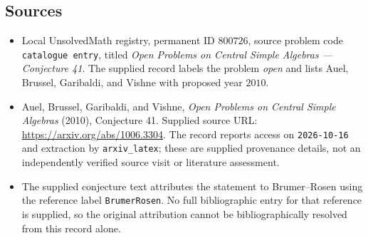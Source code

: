 \documentclass[11pt]{article}
\begin{document}
\subsection{Sources}
\begin{itemize}
\item Local UnsolvedMath registry, permanent ID \(800726\), source problem code \texttt{catalogue entry}, titled \emph{Open Problems on Central Simple Algebras --- Conjecture 41}. The supplied record labels the problem \emph{open} and lists Auel, Brussel, Garibaldi, and Vishne with proposed year \(2010\).
\item Auel, Brussel, Garibaldi, and Vishne, \emph{Open Problems on Central Simple Algebras} (2010), Conjecture 41. Supplied source URL: \url{https://arxiv.org/abs/1006.3304}. The record reports access on \texttt{2026-10-16} and extraction by \texttt{arxiv\_latex}; these are supplied provenance details, not an independently verified source visit or literature assessment.
\item The supplied conjecture text attributes the statement to Brumer--Rosen using the reference label \texttt{BrumerRosen}. No full bibliographic entry for that reference is supplied, so the original attribution cannot be bibliographically resolved from this record alone.
\end{itemize}
\end{document}
